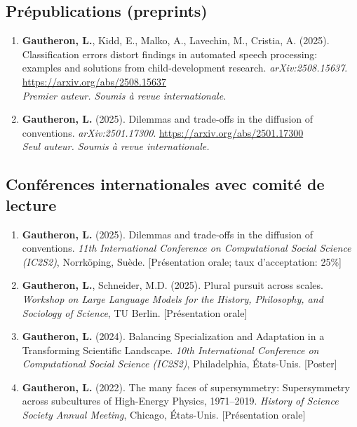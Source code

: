 \documentclass[11pt,a4paper]{article}
\begin{document}
\subsection{Prépublications (preprints)}

\begin{enumerate}
    \item \textbf{Gautheron, L.}, Kidd, E., Malko, A., Lavechin, M., Cristia, A. (2025). Classification errors distort findings in automated speech processing: examples and solutions from child-development research. \textit{arXiv:2508.15637}. \url{https://arxiv.org/abs/2508.15637}\\
    \textit{Premier auteur. Soumis à revue internationale.}
    
    \item \textbf{Gautheron, L.} (2025). Dilemmas and trade-offs in the diffusion of conventions. \textit{arXiv:2501.17300}. \url{https://arxiv.org/abs/2501.17300}\\
    \textit{Seul auteur. Soumis à revue internationale.}
\end{enumerate}

\subsection{Conférences internationales avec comité de lecture}

\begin{enumerate}
    \item \textbf{Gautheron, L.} (2025). Dilemmas and trade-offs in the diffusion of conventions. \textit{11th International Conference on Computational Social Science (IC2S2)}, Norrköping, Suède. [Présentation orale; taux d'acceptation: 25\%]
    
    \item \textbf{Gautheron, L.}, Schneider, M.D. (2025). Plural pursuit across scales. \textit{Workshop on Large Language Models for the History, Philosophy, and Sociology of Science}, TU Berlin. [Présentation orale]
    
    \item \textbf{Gautheron, L.} (2024). Balancing Specialization and Adaptation in a Transforming Scientific Landscape. \textit{10th International Conference on Computational Social Science (IC2S2)}, Philadelphia, États-Unis. [Poster]
    
    \item \textbf{Gautheron, L.} (2022). The many faces of supersymmetry: Supersymmetry across subcultures of High-Energy Physics, 1971--2019. \textit{History of Science Society Annual Meeting}, Chicago, États-Unis. [Présentation orale]
\end{enumerate}
\end{document}
